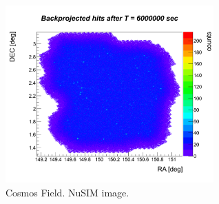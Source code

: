 \begin{figure}[h]
\begin{center}
\includegraphics[width=8cm]{Cosmos/Cosmos_v3_noselections.png}  %
\caption{Cosmos Field. NuSIM image.}
\label{cosmosimg} 
\end{center}
\end{figure}

